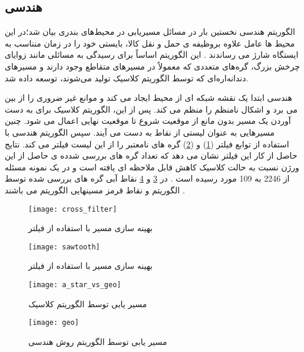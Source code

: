 \subsection{هندسی}
الگوریتم هندسی   نخستین بار در مسائل مسیریابی در محیط‌های بندری بیان شد؛در این محیط ها عامل علاوه بروظیفه ی حمل و نقل کالا، بایستی خود را در زمان منناسب به ایستگاه شارژ می رساندند . این الگوریتم اساساً برای رسیدگی به مسائلی مانند زوایای چرخش بزرگ، گره‌های متعددی که معمولاً در مسیرهای متقاطع وجود دارند و مسیرهای دندانه‌اره‌ای که توسط الگوریتم کلاسیک   تولید می‌شوند، توسعه داده شد.  
\par
{} هندسی ابتدا یک نقشه شبکه ای از محیط ایجاد می کند و موانع غیر ضروری را از بین می برد و اشکال نامنظم را منظم می کند. پس از این، الگوریتم کلاسیک   برای به دست آوردن یک مسیر بدون مانع از موقعیت شروع تا موقعیت نهایی اعمال می شود. چنین مسیرهایی به عنوان لیستی از نقاط به دست می آیند. سپس الگوریتم هندسی   با استفاده از توابع فیلتر
(\ref{crosspath:fig1})
و
(\ref{sawtooth:fig2})
گره های نامعتبر را از این لیست فیلتر می کند. نتایج حاصل از کار این فیلتر نشان می دهد که تعداد گره های بررسی شدده ی حاصل از این ورژن نسبت به حالت کلاسیک کاهش قابل ملاحظه ای یافته است و در یک نمونه مسئله از 2246 به 109 مورد رسیده است . در 
\ref{a_star}
و
\ref{geo}
نقاط آبی گره های بررسی شده توسط الگوریتم و نقاط قرمز مسینهایی الگوریتم می باشند .

\begin{figure}[h]
	\texttt{[image: cross\_filter]}
	\centering
	\caption{بهینه سازی  مسیر با استفاده از فیلتر }
	\cite{paliwal2023survey}
	\label{crosspath:fig1}
\end{figure} 

\begin{figure}[h]
	\texttt{[image: sawtooth]}
	\centering
	\caption{بهینه سازی  مسیر با استفاده از فیلتر }
	\cite{paliwal2023survey}
	\label{sawtooth:fig2}
\end{figure}
\begin{figure}[h]
	\texttt{[image: a\_star\_vs\_geo]}
	\centering
	\caption{مسیر یابی توسط الگوریتم کلاسیک }
	\cite{paliwal2023survey}
	\label{a_star}
\end{figure}

\begin{figure}[h]
	\texttt{[image: geo]}
	\centering
	\caption{ مسیر یابی توسط الگوریتم روش هندسی }
	\cite{paliwal2023survey}
	\label{geo}
\end{figure}